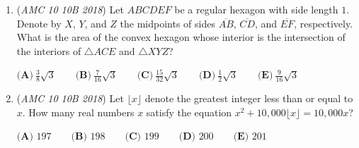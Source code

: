 \begin{enumerate}
 $\textbf{(A)} \text{ 0} \qquad \textbf{(B)} \text{ 2} \qquad \textbf{(C)} \text{ 4} \qquad \textbf{(D)} \text{ 6} \qquad \textbf{(E)} \text{ 8}$


	\item (\textit{AMC 10 10B 2018}) Let $ABCDEF$ be a regular hexagon with side length $1$. Denote by $X$, $Y$, and $Z$ the midpoints of sides $\overline {AB}$, $\overline{CD}$, and $\overline{EF}$, respectively. What is the area of the convex hexagon whose interior is the intersection of the interiors of $\triangle ACE$ and $\triangle XYZ$?


 $\textbf{(A)}\ \frac {3}{8}\sqrt{3} \qquad \textbf{(B)}\ \frac {7}{16}\sqrt{3} \qquad \textbf{(C)}\ \frac {15}{32}\sqrt{3} \qquad  \textbf{(D)}\ \frac {1}{2}\sqrt{3} \qquad \textbf{(E)}\ \frac {9}{16}\sqrt{3}$


	\item (\textit{AMC 10 10B 2018}) Let $\lfloor x \rfloor$ denote the greatest integer less than or equal to $x$. How many real numbers $x$ satisfy the equation $x^2 + 10,000\lfloor x \rfloor = 10,000x$?


 $\textbf{(A) } 197 \qquad \textbf{(B) } 198 \qquad \textbf{(C) } 199 \qquad \textbf{(D) } 200 \qquad \textbf{(E) } 201$


\end{enumerate}